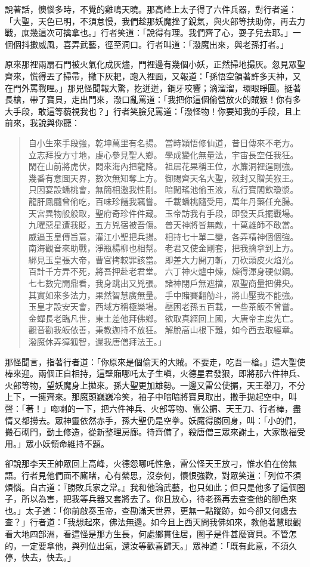 說著話，懊惱多時，不覺的雞鳴天曉。那高峰上太子得了六件兵器，對行者道：「大聖，天色已明，不須怠慢，我們趁那妖魔挫了銳氣，與火部等扶助你，再去力戰，庶幾這次可擒拿也。」行者笑道：「說得有理。我們齊了心，耍子兒去耶。」一個個抖擻威風，喜弄武藝，徑至洞口。行者叫道：「潑魔出來，與老孫打者。」

原來那裡兩扇石門被火氣化成灰燼，門裡邊有幾個小妖，正然掃地撮灰。忽見眾聖齊來，慌得丟了掃帚，撇下灰耙，跑入裡面，又報道：「孫悟空領著許多天神，又在門外罵戰哩。」那兕怪聞報大驚，扢迸迸，鋼牙咬響；滴溜溜，環眼睜圓。挺著長槍，帶了寶貝，走出門來，潑口亂罵道：「我把你這個偷營放火的賊猴！你有多大手段，敢這等藐視我也？」行者笑臉兒罵道：「潑怪物！你要知我的手段，且上前來，我說與你聽：
\begin{quote}
自小生來手段強，乾坤萬里有名揚。
當時穎悟修仙道，昔日傳來不老方。
立志拜投方寸地，虔心參見聖人鄉。
學成變化無量法，宇宙長空任我狂。
閑在山前將虎伏，悶來海內把龍降。
祖居花果稱王位，水簾洞裡逞剛強。
幾番有意圖天界，數次無知奪上方。
御賜齊天名大聖，敕封又贈美猴王。
只因宴設蟠桃會，無簡相邀我性剛。
暗闖瑤池偷玉液，私行寶閣飲瓊漿。
龍肝鳳髓曾偷吃，百味珍饈我竊嘗。
千載蟠桃隨受用，萬年丹藥任充腸。
天宮異物般般取，聖府奇珍件件藏。
玉帝訪我有手段，即發天兵擺戰場。
九曜惡星遭我貶，五方兇宿被吾傷。
普天神將皆無敵，十萬雄師不敢當。
威逼玉皇傳旨意，灌江小聖把兵揚。
相持七十單二變，各弄精神個個強。
南海觀音來助戰，淨瓶楊柳也相幫。
老君又使金剛套，把我擒拿到上方。
綁見玉皇張大帝，曹官拷較罪該當。
即差大力開刀斬，刀砍頭皮火焰光。
百計千方弄不死，將吾押赴老君堂。
六丁神火爐中煉，煉得渾身硬似鋼。
七七數完開鼎看，我身跳出又兇張。
諸神閉戶無遮擋，眾聖商量把佛央。
其實如來多法力，果然智慧廣無量。
手中賭賽翻觔斗，將山壓我不能強。
玉皇才設安天會，西域方稱極樂場。
壓困老孫五百載，一些茶飯不曾嘗。
金蟬長老臨凡世，東土差他拜佛鄉。
欲取真經回上國，大唐帝主度先亡。
觀音勸我皈依善，秉教迦持不放狂。
解脫高山根下難，如今西去取經章。
潑魔休弄獐狐智，還我唐僧拜法王。」
\end{quote}

那怪聞言，指著行者道：「你原來是個偷天的大賊。不要走，吃吾一槍。」這大聖使棒來迎。兩個正自相持，這壁廂哪吒太子生嗔，火德星君發狠，即將那六件神兵、火部等物，望妖魔身上拋來。孫大聖更加雄勢。一邊又雷公使㨝，天王舉刀，不分上下，一擁齊來。那魔頭巍巍冷笑，袖子中暗暗將寶貝取出，撒手拋起空中，叫聲：「著！」唿喇的一下，把六件神兵、火部等物、雷公㨝、天王刀、行者棒，盡情又都撈去。眾神靈依然赤手，孫大聖仍是空拳。妖魔得勝回身，叫：「小的們，搬石砌門，動土修造，從新整理房廊。待齊備了，殺唐僧三眾來謝土，大家散福受用。」眾小妖領命維持不題。

卻說那李天王帥眾回上高峰，火德怨哪吒性急，雷公怪天王放刁，惟水伯在傍無語。行者見他們面不廝睹，心有縈思，沒奈何，懷恨強歡，對眾笑道：「列位不須煩惱。自古道：『勝敗兵家之常。』我和他論武藝，也只如此；但只是他多了這個圈子，所以為害，把我等兵器又套將去了。你且放心，待老孫再去查查他的腳色來也。」太子道：「你前啟奏玉帝，查勘滿天世界，更無一點蹤跡，如今卻又何處去查？」行者道：「我想起來，佛法無邊。如今且上西天問我佛如來，教他著慧眼觀看大地四部洲，看這怪是那方生長，何處鄉貫住居，圈子是件甚麼寶貝。不管怎的，一定要拿他，與列位出氣，還汝等歡喜歸天。」眾神道：「既有此意，不須久停，快去，快去。」

